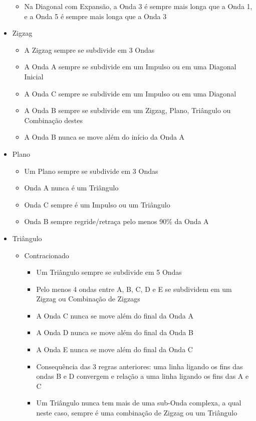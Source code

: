 \documentclass[12pt]{article}
\begin{document}
\begin{itemize}
\begin{itemize}
		\item Na Diagonal com Expansão, a Onda 3 é sempre mais longa que a Onda 1, e a Onda 5 é sempre mais longa que a Onda 3			
	\end{itemize}
	\item Zigzag
	\begin{itemize}
		\item A Zigzag sempre se subdivide em 3 Ondas
		\item A Onda A sempre se subdivide em um Impulso ou em uma Diagonal Inicial
		\item A Onda C sempre se subdivide em um Impulso ou em uma Diagonal
		\item A Onda B sempre se subdivide em um Zigzag, Plano, Triângulo ou Combinação destes
		\item A Onda B nunca se move além do início da Onda A
	\end{itemize}
	\item Plano
	\begin{itemize}
		\item Um Plano sempre se subdivide em 3 Ondas
		\item Onda A nunca é um Triângulo
		\item Onda C sempre é um Impulso ou um Triângulo
		\item Onda B sempre regride/retraça pelo menos 90\% da Onda A
	\end{itemize}
	\item Triângulo
	\begin{itemize}
		\item Contracionado
		\begin{itemize}
			\item Um Triângulo sempre se subdivide em 5 Ondas
			\item Pelo menos 4 ondas entre A, B, C, D e E se subdividem em um Zigzag ou Combinação de Zigzags
			\item A Onda C nunca se move além do final da Onda A
			\item A Onda D nunca se move além do final da Onda B
			\item A Onda E nunca se move além do final da Onda C
			\item Consequência das 3 regras anteriores: uma linha ligando os fins das ondas B e D convergem e relação a uma linha ligando os fins das A e C
			\item Um Triângulo nunca tem mais de uma sub-Onda complexa, a qual neste caso, sempre é uma combinação de Zigzag ou um Triângulo
		\end{itemize}

\end{itemize}
\end{itemize}
\end{document}

